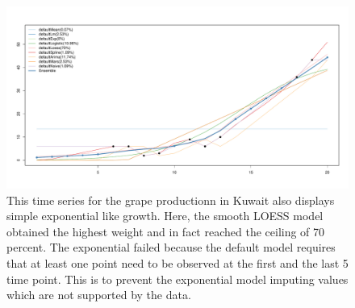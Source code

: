 \documentclass[nojss]{jss}\usepackage[]{graphicx}\usepackage[]{color}
\makeatletter
\def\maxwidth{ %
  \ifdim\Gin@nat@width>\linewidth
    \linewidth
  \else
    \Gin@nat@width
  \fi
}
\newenvironment{knitrout}{}{} %
\makeatother
\begin{document}
\begin{knitrout}
\color{fgcolor}\begin{figure}[!ht]


{\centering \includegraphics[width=\maxwidth]{figure/grape-kuwait} 

}

\caption[This time series for the grape productionn in Kuwait also displays simple exponential like growth]{This time series for the grape productionn in Kuwait also displays simple exponential like growth. Here, the smooth LOESS model obtained the highest weight and in fact reached the ceiling of 70 percent. The exponential failed because the default model requires that at least one point need to be observed at the first and the last 5 time point. This is to prevent the exponential model imputing values which are not supported by the data.\label{fig:grape-kuwait}}
\end{figure}


\end{knitrout}
\end{document}
